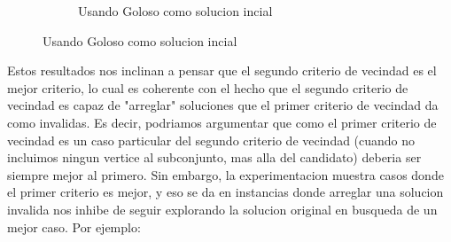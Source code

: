 \begin{itemize}
\begin{figure}[H]
\begin{subfigure}[b]{0.5\textwidth}
                \caption{Usando Goloso como solucion incial}
        \end{subfigure}

\end{figure}


\end{itemize}



Estos resultados nos inclinan a pensar que el segundo criterio de vecindad es el mejor criterio, lo cual es coherente con el hecho que el segundo criterio de vecindad es capaz de "arreglar" soluciones que el primer criterio de vecindad da como invalidas. Es decir, podriamos argumentar que como el primer criterio de vecindad es un caso particular del segundo criterio de vecindad (cuando no incluimos ningun vertice al subconjunto, mas alla del candidato) deberia ser siempre mejor al primero. Sin embargo, la experimentacion muestra casos donde el primer criterio es mejor, y eso se da en instancias donde arreglar una solucion invalida nos inhibe de seguir explorando la solucion original en busqueda de un mejor caso. Por ejemplo:

